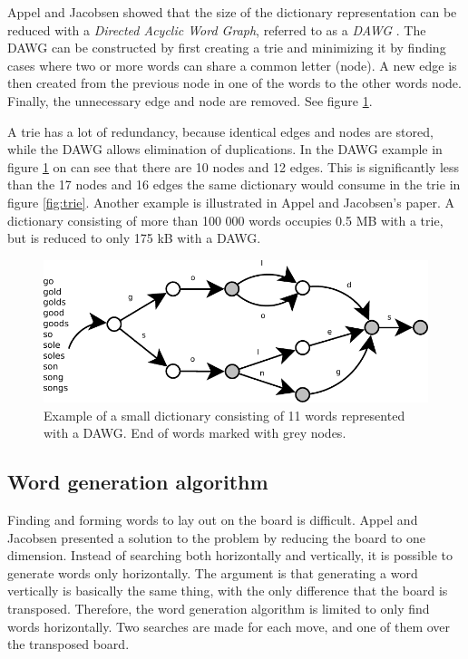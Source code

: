\documentclass[a4paper, 12pt]{report}
\begin{document}
Appel and Jacobsen showed that the size of the dictionary representation can be reduced with a \emph{Directed Acyclic Word Graph}, referred to as a \emph{DAWG} \cite{fastest}. The DAWG can be constructed by first creating a trie and minimizing it by finding cases where two or more words can share a common letter (node). A new edge is then created from the previous node in one of the words to the other words node. Finally, the unnecessary edge and node are removed. See figure \ref{fig:dawg}.

A trie has a lot of redundancy, because identical edges and nodes are stored, while the DAWG allows elimination of duplications. In the DAWG example in figure \ref{fig:dawg} on can see that there are 10 nodes and 12 edges. This is significantly less than the 17 nodes and 16 edges the same dictionary would consume in the trie in figure \ref{fig:trie}. Another example is illustrated in Appel and Jacobsen's paper\cite{fastest}. A dictionary consisting of more than 100 000 words occupies 0.5 MB with a trie, but is reduced to only 175 kB with a DAWG.

\begin{figure}[h]
\centering
\includegraphics[scale=1]{dawg}
\caption{Example of a small dictionary consisting of 11 words represented with a DAWG. End of words marked with grey nodes.}
\label{fig:dawg}
\end{figure}

\subsection{Word generation algorithm}
\label{sec:generation}
Finding and forming words to lay out on the board is difficult. Appel and Jacobsen presented a solution to the problem by reducing the board to one dimension. Instead of searching both horizontally and vertically, it is possible to generate words only horizontally. The argument is that generating a word vertically is basically the same thing, with the only difference that the board is transposed. Therefore, the word generation algorithm is limited to only find words horizontally. Two searches are made for each move, and one of them over the transposed board. \cite{fastest}
\end{document}
